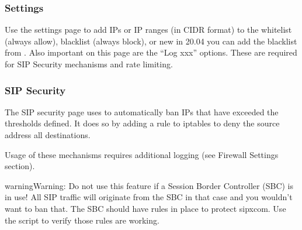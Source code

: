 \documentclass[letterpaper,10pt,english]{sphinxmanual}
\begin{document}
\subsubsection{Settings}
\label{\detokenize{webui:settings}}
Use the settings page to add IPs or IP ranges (in CIDR format) to the whitelist (always allow), blacklist (always block), or new in 20.04 you can add the blacklist from .
Also important on this page are the “Log xxx” options. These are required for SIP Security mechanisms and rate limiting.
\begin{quote}

\end{quote}


\subsubsection{SIP Security}
\label{\detokenize{webui:sip-security}}\label{\detokenize{webui:id25}}
The SIP security page uses  to automatically ban IPs that have exceeded the thresholds defined. It does so by adding a rule to iptables to deny the source address all destinations.
\begin{quote}

\end{quote}

Usage of these mechanisms requires additional logging (see Firewall Settings section).

\begin{sphinxadmonition}{warning}{Warning:}
Do not use this feature if a Session Border Controller (SBC) is in use! All SIP traffic will originate from the SBC in that case and you wouldn’t want to ban that. The SBC should have rules in place to protect sipxcom.
Use the {\hyperref[\detokenize{troubleshooting:sipcodes}]{}} script to verify those rules are working.
\end{sphinxadmonition}

\end{document}
